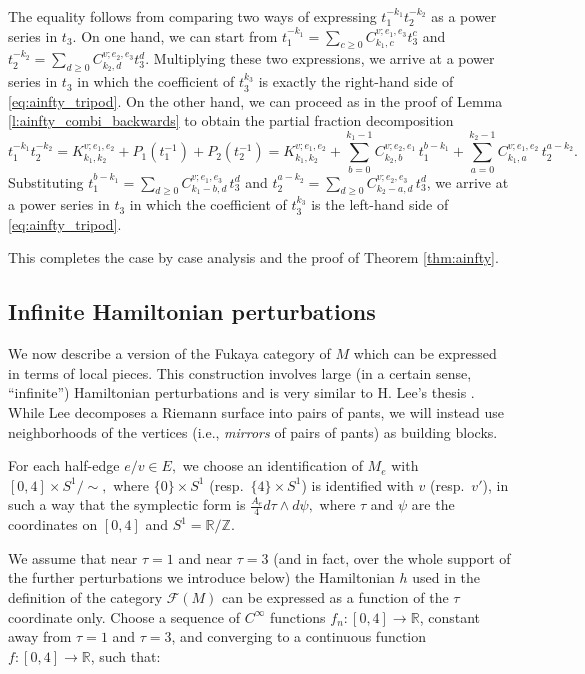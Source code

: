 \documentclass[11pt,leqno]{amsart}
\numberwithin{equation}{section}
\def\R{\mathbb{R}}
\def\Z{\mathbb{Z}}
\newcommand{\cF}{{\mathcal F}}
\begin{document}
\proof The equality follows from comparing two ways of expressing $t_1^{-k_1}t_2^{-k_2}$ as a
power series in $t_3$. On one hand, we can start from
$t_1^{-k_1}=\sum\limits_{c\geq 0} C_{k_1,c}^{v;e_1,e_3} t_3^c$ and
$t_2^{-k_2}=\sum\limits_{d\geq 0} C_{k_2,d}^{v;e_2,e_3} t_3^d$. Multiplying
these two expressions, we arrive at a power series in $t_3$ in which the
coefficient of $t_3^{k_3}$ is exactly the right-hand side of
\eqref{eq:ainfty_tripod}. On the other hand, we can proceed as 
in the proof of Lemma \ref{l:ainfty_combi_backwards} to obtain the partial
fraction decomposition
\begin{equation}\label{eq:partialproduct}
t_1^{-k_1}t_2^{-k_2}=K_{k_1,k_2}^{v;e_1,e_2}+P_1(t_1^{-1})+P_2(t_2^{-1})=
K_{k_1,k_2}^{v;e_1,e_2}+\sum_{b=0}^{k_1-1} C_{k_2,b}^{v;e_2,e_1}\,t_1^{b-k_1}
+\sum_{a=0}^{k_2-1} C_{k_1,a}^{v;e_1,e_2}\,t_2^{a-k_2}.
\end{equation}
Substituting $t_1^{b-k_1}=\sum\limits_{d\geq 0} C_{k_1-b,d}^{v;e_1,e_3}\, t_3^d$
and $t_2^{a-k_2}=\sum\limits_{d\geq 0} C_{k_2-a,d}^{v;e_2,e_3}\, t_3^d$, we
arrive at a power series in $t_3$ in which the coefficient of $t_3^{k_3}$ is
the left-hand side of \eqref{eq:ainfty_tripod}.
\endproof

This completes the case by case analysis and the proof of Theorem
\ref{thm:ainfty}.

\subsection{Infinite Hamiltonian perturbations}\label{ss:FMH}

We now describe a version of the Fukaya category of $M$ which can be
expressed in terms of local pieces. This construction involves large (in a certain sense, ``infinite'') 
Hamiltonian perturbations and is very similar to H. Lee's thesis
\cite{Lee}. While Lee decomposes a Riemann surface into pairs of pants, we
will instead use neighborhoods of the vertices
(i.e., {\em mirrors} of pairs of pants) as building blocks.

For each half-edge $e/v\in E,$ we choose an identification of $M_e$ with $[0,4]\times S^1/\sim,$ 
where $\{0\}\times S^1$ (resp.\ $\{4\}\times S^1$) is identified with $v$
(resp.\ $v'$), in such a way that the symplectic form is $\frac{A_e}{4}d\tau\wedge d\psi,$ 
where $\tau$ and $\psi$ are the coordinates on $[0,4]$ and $S^1=\R/\Z.$ 

We assume that near $\tau=1$ and near $\tau=3$ (and in fact, over the whole
support of the further perturbations we introduce below) the Hamiltonian $h$ used in the definition 
of the category $\cF(M)$ can be expressed as a function of the $\tau$ coordinate only.
Choose a sequence of $C^\infty$ functions $f_n:[0,4]\to\R$, constant away
from $\tau=1$ and $\tau=3$, and converging to a continuous
function $f:[0,4]\to\R$, such that:
\end{document}

